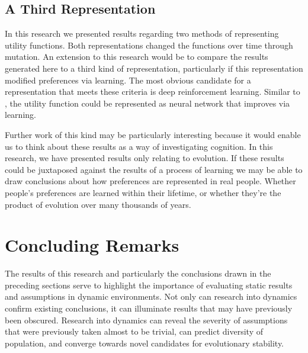 \documentclass[11pt]{book}
\newcommand*{\np}{\par\noindent\newline}
\begin{document}
\subsection{A Third Representation}
In this research we presented results regarding two methods of representing utility functions.
Both representations changed the functions over time through mutation.
An extension to this research would be to compare the results generated here to a third kind of representation, particularly if this representation modified preferences via learning.
The most obvious candidate for a representation that meets these criteria is deep reinforcement learning.
Similar to \citet{peysakhovich_prosocial_2017}, the utility function could be represented as neural network that improves via learning.

\np Further work of this kind may be particularly interesting because it would enable us to think about these results as a way of investigating cognition.
In this research, we have presented results only relating to evolution.
If these results could be juxtaposed against the results of a process of learning we may be able to draw conclusions about how preferences are represented in real people.
Whether people's preferences are learned within their lifetime, or whether they're the product of evolution over many thousands of years.

\section{Concluding Remarks}
The results of this research and particularly the conclusions drawn in the preceding sections serve to highlight the importance of evaluating static results and assumptions in dynamic environments.
Not only can research into dynamics confirm existing conclusions, it can illuminate results that may have previously been obscured.
Research into dynamics can reveal the severity of assumptions that were previously taken almost to be trivial, can predict diversity of population, and converge towards novel candidates for evolutionary stability. 
 


\end{document}
